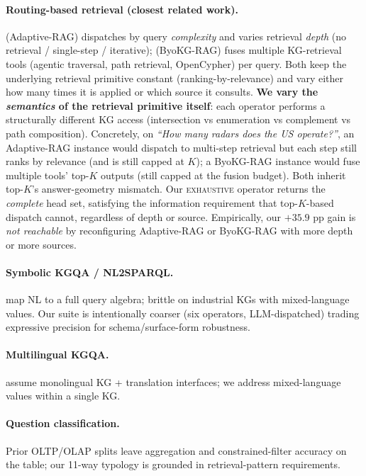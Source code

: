 \documentclass[review]{elsarticle}
\newcommand{\op}[1]{\textsc{\small #1}}
\begin{document}
\paragraph{Routing-based retrieval (closest related work).} \citet{jeong2024adaptiverag} (Adaptive-RAG) dispatches by query \emph{complexity} and varies retrieval \emph{depth} (no retrieval / single-step / iterative); \citet{byokgrag2025} (ByoKG-RAG) fuses multiple KG-retrieval tools (agentic traversal, path retrieval, OpenCypher) per query. Both keep the underlying retrieval primitive constant (ranking-by-relevance) and vary either how many times it is applied or which source it consults. \textbf{We vary the \emph{semantics} of the retrieval primitive itself}: each operator performs a structurally different KG access (intersection vs enumeration vs complement vs path composition). Concretely, on \emph{``How many radars does the US operate?''}, an Adaptive-RAG instance would dispatch to multi-step retrieval but each step still ranks by relevance (and is still capped at $K$); a ByoKG-RAG instance would fuse multiple tools' top-$K$ outputs (still capped at the fusion budget). Both inherit top-$K$'s answer-geometry mismatch. Our \op{exhaustive} operator returns the \emph{complete} head set, satisfying the information requirement that top-$K$-based dispatch cannot, regardless of depth or source. Empirically, our $+35.9$ pp gain is \emph{not reachable} by reconfiguring Adaptive-RAG or ByoKG-RAG with more depth or more sources.

\paragraph{Symbolic KGQA / NL2SPARQL.} \citet{jiang2023structgpt,baek2023kaping} map NL to a full query algebra; brittle on industrial KGs with mixed-language values. Our suite is intentionally coarser (six operators, LLM-dispatched) trading expressive precision for schema/surface-form robustness.

\paragraph{Multilingual KGQA.} \citet{perevalov2024multilingual} assume monolingual KG + translation interfaces; we address mixed-language values within a single KG.

\paragraph{Question classification.} Prior OLTP/OLAP splits leave aggregation and constrained-filter accuracy on the table; our 11-way typology is grounded in retrieval-pattern requirements.
\end{document}
